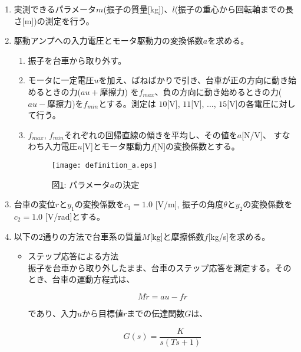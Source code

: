 \documentclass[a4j,11pt,twoside]{jbook}
\begin{document}
\begin{enumerate}
    \item 実測できるパラメータ$m$(振子の質量[kg])、$l$(振子の重心から回転軸までの長さ[m])の測定を行う。
    \item 駆動アンプへの入力電圧とモータ駆動力の変換係数$a$を求める。
    \begin{enumerate}
        \item 振子を台車から取り外す。
        \item モータに一定電圧$u$を加え、ばねばかりで引き、台車が正の方向に動き始めるときの力($au+$摩擦力)
        を$f_{max}$、負の方向に動き始めるときの力($au-$摩擦力)を$f_{min}$とする。測定は
        $10$[V], $11$[V], ..., $15$[V]の各電圧に対して行う。
        \item $f_{max}$, $f_{min}$それぞれの回帰直線の傾きを平均し、その値を$a$[N/V]、
        すなわち入力電圧$u$[V]とモータ駆動力$f$[N]の変換係数とする。
        \begin{figure}[htbp]
            \begin{center}
                \texttt{[image: definition\_a.eps]}
                \caption{図\ref{definition_a}: パラメータ$a$の決定}
                \label{definition_a}
            \end{center}
        \end{figure}
    \end{enumerate}

    \item 台車の変位$r$と$y_{1}$の変換係数を$c_{1} = 1.0$ [V/m], 
    振子の角度$\theta$と$y_{2}$の変換係数を$c_{2} = 1.0$ [V/rad]とする。

    \item 以下の2通りの方法で台車系の質量$M$[kg]と摩擦係数$f$[kg/s]を求める。
    \begin{itemize}
        \item ステップ応答による方法　\\
        \quad 振子を台車から取り外したまま、台車のステップ応答を測定する。そのとき、台車の運動方程式は、

        \begin{equation}
            M \ddot r = au - fr
        \end{equation}

        であり、入力$u$から目標値$r$までの伝達関数$G$は、

        \begin{equation}
            G(s) = \frac{K}{s(Ts + 1)}
        \end{equation}


\end{itemize}
\end{enumerate}
\end{document}
